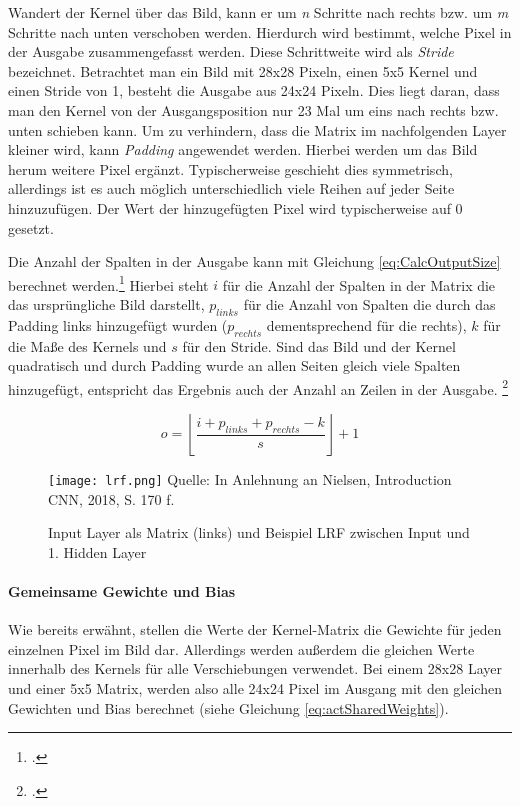 Wandert der Kernel über das Bild, kann er um \textit{n} Schritte nach rechts bzw. um \textit{m} Schritte nach unten verschoben werden. Hierdurch wird bestimmt, welche Pixel in der Ausgabe zusammengefasst werden. Diese Schrittweite wird als \textit{Stride} bezeichnet. Betrachtet man ein Bild mit 28x28 Pixeln, einen 5x5 Kernel und einen Stride von 1, besteht die Ausgabe aus 24x24 Pixeln. Dies liegt daran, dass man den Kernel von der Ausgangsposition nur 23 Mal um eins nach rechts bzw. unten schieben kann. Um zu verhindern, dass die Matrix im nachfolgenden Layer kleiner wird, kann \textit{Padding} angewendet werden. Hierbei werden um das Bild herum weitere Pixel ergänzt. Typischerweise geschieht dies symmetrisch, allerdings ist es auch möglich unterschiedlich viele Reihen auf jeder Seite hinzuzufügen. Der Wert der hinzugefügten Pixel wird typischerweise auf $0$ gesetzt.

Die Anzahl der Spalten in der Ausgabe kann mit Gleichung \ref{eq:CalcOutputSize} berechnet werden.\footcite[Vgl.][S. 15]{dumoulinGuideConvolutionArithmetic2018} Hierbei steht $i$ für die Anzahl der Spalten in der Matrix die das ursprüngliche Bild darstellt, $p_{links}$ für die Anzahl von Spalten die durch das Padding links hinzugefügt wurden ($p_{rechts}$ dementsprechend für die rechts), $k$ für die Maße des Kernels und $s$ für den Stride. Sind das Bild und der Kernel quadratisch und durch Padding wurde an allen Seiten gleich viele Spalten hinzugefügt, entspricht das Ergebnis auch der Anzahl an Zeilen in der Ausgabe. \footcite[Vgl.][S. 169-171]{nielsenNeuralNetworksDeep2015}

\begin{equation} \label{eq:CalcOutputSize}
    o=\left\lfloor\frac{i+p_{links}+p_{rechts}-k}{s}\right\rfloor+1
\end{equation}


\begin{figure}[t]
    \centering
    \caption[]{Input Layer als Matrix (links) und Beispiel \ac{LRF} zwischen Input und 1. Hidden Layer}
	\label{fig:lrf}
    \texttt{[image: lrf.png]}
    Quelle: In Anlehnung an Nielsen, Introduction CNN, 2018, S. 170 f.
\end{figure}

\paragraph{Gemeinsame Gewichte und Bias}
Wie bereits erwähnt, stellen die Werte der Kernel-Matrix die Gewichte für jeden einzelnen Pixel im Bild dar. Allerdings werden außerdem die gleichen Werte innerhalb des Kernels für alle Verschiebungen verwendet. Bei einem 28x28 Layer und einer 5x5 Matrix, werden also alle 24x24 Pixel im Ausgang mit den gleichen Gewichten und Bias berechnet (siehe Gleichung \ref{eq:actSharedWeights}).

